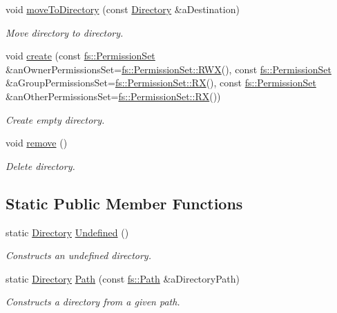 \begin{DoxyCompactItemize}
void \hyperlink{classlibrary_1_1core_1_1fs_1_1_directory_a666a1ac6f84535bb113979115a760f11}{move\+To\+Directory} (const \hyperlink{classlibrary_1_1core_1_1fs_1_1_directory}{Directory} \&a\+Destination)
\begin{DoxyCompactList}\small\item\em Move directory to directory. \end{DoxyCompactList}\item 
void \hyperlink{classlibrary_1_1core_1_1fs_1_1_directory_a4ca33de67d870bfd0f20db68242dac9d}{create} (const \hyperlink{classlibrary_1_1core_1_1fs_1_1_permission_set}{fs\+::\+Permission\+Set} \&an\+Owner\+Permissions\+Set=\hyperlink{classlibrary_1_1core_1_1fs_1_1_permission_set_afa3f9d07a7053240ae97c587543cdb00}{fs\+::\+Permission\+Set\+::\+R\+WX}(), const \hyperlink{classlibrary_1_1core_1_1fs_1_1_permission_set}{fs\+::\+Permission\+Set} \&a\+Group\+Permissions\+Set=\hyperlink{classlibrary_1_1core_1_1fs_1_1_permission_set_ab632d79f1b8b8f4577bc06fa622b1c09}{fs\+::\+Permission\+Set\+::\+RX}(), const \hyperlink{classlibrary_1_1core_1_1fs_1_1_permission_set}{fs\+::\+Permission\+Set} \&an\+Other\+Permissions\+Set=\hyperlink{classlibrary_1_1core_1_1fs_1_1_permission_set_ab632d79f1b8b8f4577bc06fa622b1c09}{fs\+::\+Permission\+Set\+::\+RX}())
\begin{DoxyCompactList}\small\item\em Create empty directory. \end{DoxyCompactList}\item 
void \hyperlink{classlibrary_1_1core_1_1fs_1_1_directory_a8392a637e3b8cc07f55c0bc2850fb42b}{remove} ()
\begin{DoxyCompactList}\small\item\em Delete directory. \end{DoxyCompactList}\end{DoxyCompactItemize}
\subsection*{Static Public Member Functions}
\begin{DoxyCompactItemize}
\item 
static \hyperlink{classlibrary_1_1core_1_1fs_1_1_directory}{Directory} \hyperlink{classlibrary_1_1core_1_1fs_1_1_directory_ae26fce16c37e5fed2bcc4d914a5eaa71}{Undefined} ()
\begin{DoxyCompactList}\small\item\em Constructs an undefined directory. \end{DoxyCompactList}\item 
static \hyperlink{classlibrary_1_1core_1_1fs_1_1_directory}{Directory} \hyperlink{classlibrary_1_1core_1_1fs_1_1_directory_a6d3ea04654841e62a4dbd99feb563caf}{Path} (const \hyperlink{classlibrary_1_1core_1_1fs_1_1_path}{fs\+::\+Path} \&a\+Directory\+Path)
\begin{DoxyCompactList}\small\item\em Constructs a directory from a given path. \end{DoxyCompactList}\end{DoxyCompactItemize}
